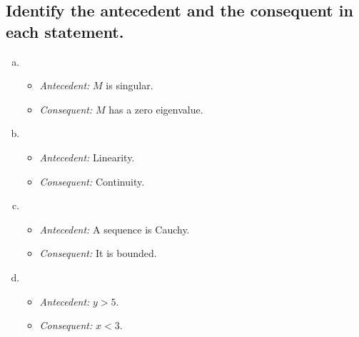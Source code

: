 \documentclass[12pt]{scrartcl} %
\begin{document}
\subsection{Identify the antecedent and the consequent in each statement.}
\begin{enumerate}[(a)]
	
	\item
	\begin{itemize}
		\item \emph{Antecedent:} $M$ is singular.
		\item \emph{Consequent:} $M$ has a zero eigenvalue.
	\end{itemize}
	
	\item
	\begin{itemize}
		\item \emph{Antecedent:} Linearity.
		\item \emph{Consequent:} Continuity.
	\end{itemize}
	
	\item
	\begin{itemize}
		\item \emph{Antecedent:} A sequence is Cauchy.
		\item \emph{Consequent:} It is bounded.
	\end{itemize}
	
	\item
	\begin{itemize}
		\item \emph{Antecedent:} $y > 5$.
		\item \emph{Consequent:} $x <3$.
	\end{itemize}
	\end{enumerate}
\end{document}
